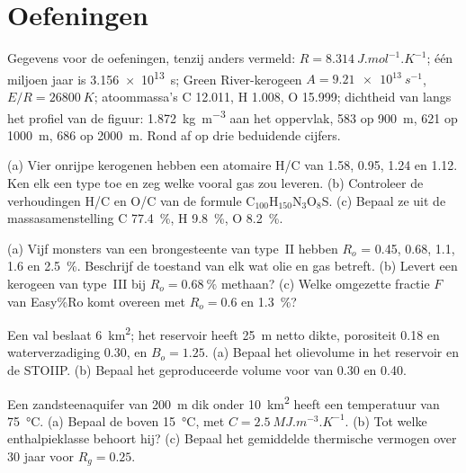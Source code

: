 \section*{Oefeningen}\label{sec:b2:energy-geology:exercises}

Gegevens voor de oefeningen, tenzij anders vermeld: $R = \qty{8.314}{J.mol^{-1}.K^{-1}}$; één miljoen
jaar is \qty{3.156e13}{s}; Green River-kerogeen $A = \qty{9.21e13}{s^{-1}}$, $E/R = \qty{26800}{K}$;
atoommassa's C 12.011, H 1.008, O 15.999; dichtheid van  langs het profiel van de figuur:
\qty{1.872}{kg.m^{-3}} aan het oppervlak, 583 op \qty{900}{m}, 621 op \qty{1000}{m}, 686 op
\qty{2000}{m}. Rond af op drie beduidende cijfers.

\begin{exercise}[$\star$]\label{exo:b2:energy-geology:1}
(a) Vier onrijpe kerogenen hebben een atomaire H/C van 1.58, 0.95, 1.24 en 1.12. Ken elk een type toe en zeg
welke vooral gas zou leveren. (b) Controleer de verhoudingen H/C en O/C van de formule
C$_{100}$H$_{150}$N$_3$O$_8$S. (c) Bepaal ze uit de massasamenstelling C \qty{77.4}{\percent}, H
\qty{9.8}{\percent}, O \qty{8.2}{\percent}.
\end{exercise}

\begin{exercise}[$\star$]\label{exo:b2:energy-geology:2}
(a) Vijf monsters van een brongesteente van type~II hebben $R_o$ = 0.45, 0.68, 1.1, 1.6 en \qty{2.5}{\percent}.
Beschrijf de toestand van elk wat olie en gas betreft. (b) Levert een kerogeen van type~III bij $R_o =
\qty{0.68}{\percent}$ methaan? (c) Welke omgezette fractie $F$ van Easy\%Ro komt overeen met
$R_o = 0.6$ en \qty{1.3}{\percent}?
\end{exercise}

\begin{exercise}[$\star$]\label{exo:b2:energy-geology:3}
Een val beslaat \qty{6}{km^2}; het reservoir heeft \qty{25}{m} netto dikte, porositeit 0.18 en
waterverzadiging 0.30, en $B_o = 1.25$. (a) Bepaal het olievolume in het reservoir en de STOIIP. (b) Bepaal
het geproduceerde volume voor  van 0.30 en 0.40.
\end{exercise}

\begin{exercise}[$\star$]\label{exo:b2:energy-geology:4}
Een zandsteenaquifer van \qty{200}{m} dik onder \qty{10}{km^2} heeft een temperatuur van \qty{75}{\celsius}. (a) Bepaal de
 boven \qty{15}{\celsius}, met $C = \qty{2.5}{MJ.m^{-3}.K^{-1}}$. (b) Tot welke
enthalpieklasse behoort hij? (c) Bepaal het gemiddelde thermische vermogen over 30 jaar voor $R_g = 0.25$.
\end{exercise}

